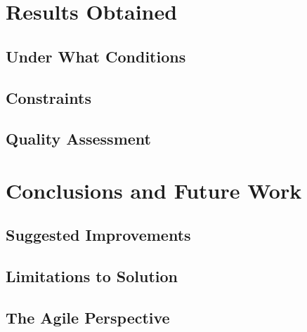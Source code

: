 \documentclass[a4paper,12pt]{report}
\begin{document}
\chapter{Results Obtained}
\section{Under What Conditions}
\section{Constraints}
\section{Quality Assessment}

\chapter{Conclusions and Future Work}
\section{Suggested Improvements}
\section{Limitations to Solution}
\section{The Agile Perspective}
\end{document}
